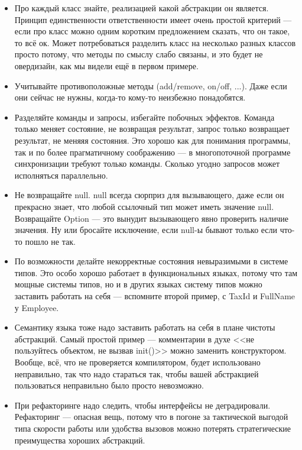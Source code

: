 \documentclass[a5paper]{article}
\begin{document}
\begin{itemize}
    \item Про каждый класс знайте, реализацией какой абстракции он является. Принцип единственности ответственности имеет очень простой критерий --- если про класс можно одним коротким предложением сказать, что он такое, то всё ок. Может потребоваться разделить класс на несколько разных классов просто потому, что методы по смыслу слабо связаны, и это будет не овердизайн, как мы видели ещё в первом примере.
    \item Учитывайте противоположные методы (add/remove, on/off, ...). Даже если они сейчас не нужны, когда-то кому-то неизбежно понадобятся.
    \item Разделяйте команды и запросы, избегайте побочных эффектов. Команда только меняет состояние, не возвращая результат, запрос только возвращает результат, не меняяя состояния. Это хорошо как для понимания программы, так и по более прагматичному соображению --- в многопоточной программе синхронизации требуют только команды. Сколько угодно запросов может исполняться параллельно.
    \item Не возвращайте null. null всегда сюрприз для вызывающего, даже если он прекрасно знает, что любой ссылочный тип может иметь значение null. Возвращайте Option --- это вынудит вызывающего явно проверить наличие значения. Ну или бросайте исключение, если null-ы бывают только если что-то пошло не так.
    \item По возможности делайте некорректные состояния невыразимыми в системе типов. Это особо хорошо работает в функциональных языках, потому что там мощные системы типов, но и в других языках систему типов можно заставить работать на себя --- вспомните второй пример, с TaxId и FullName у Employee.
    \item Семантику языка тоже надо заставить работать на себя в плане чистоты абстракций. Самый простой пример --- комментарии в духе <<не пользуйтесь объектом, не вызвав  init()>> можно заменить конструктором. Вообще, всё, что не проверяется компилятором, будет использовано неправильно, так что надо стараться так, чтобы вашей абстракцией пользоваться неправильно было просто невозможно.
    \item При рефакторинге надо следить, чтобы интерфейсы не деградировали. Рефакторинг --- опасная вещь, потому что в погоне за тактической выгодой типа скорости работы или удобства вызовов можно потерять стратегические преимущества хороших абстракций.
\end{itemize}
\end{document}
